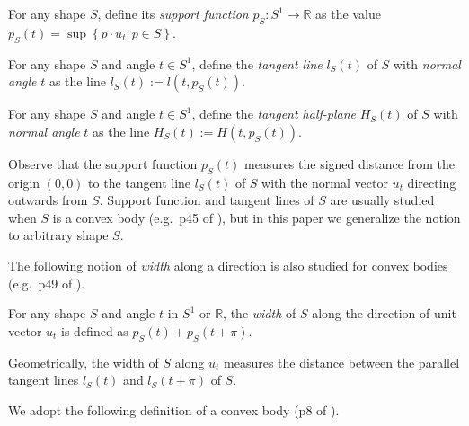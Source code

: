\begin{definition}

For any shape \(S\), define its \emph{support function} \(p_S : S^1 \to \mathbb{R}\) as the value \(p_S(t) = \sup \left\{ p \cdot u_t : p \in S \right\}\).

\label{def:support-function}
\end{definition}

\begin{definition}

For any shape \(S\) and angle \(t \in S^1\), define the \emph{tangent line} \(l_S(t)\) of \(S\) with \emph{normal angle} \(t\) as the line \(l_S(t) := l(t, p_S(t))\).

\label{def:tangent-line}
\end{definition}

\begin{definition}

For any shape \(S\) and angle \(t \in S^1\), define the \emph{tangent half-plane} \(H_S(t)\) of \(S\) with \emph{normal angle} \(t\) as the line \(H_S(t) := H(t, p_S(t))\).

\label{def:tangent-half-plane}
\end{definition}

Observe that the support function \(p_S(t)\) measures the signed distance from the origin \((0, 0)\) to the tangent line \(l_S(t)\) of \(S\) with the normal vector \(u_t\) directing outwards from \(S\). Support function and tangent lines of \(S\) are usually studied when \(S\) is a convex body (e.g.~p45 of \cite{schneider_2013}), but in this paper we generalize the notion to arbitrary shape \(S\).

The following notion of \emph{width} along a direction is also studied for convex bodies (e.g.~p49 of \cite{schneider_2013}).

\begin{definition}

For any shape \(S\) and angle \(t\) in \(S^1\) or \(\mathbb{R}\), the \emph{width} of \(S\) along the direction of unit vector \(u_t\) is defined as \(p_S(t) + p_S(t + \pi)\).

\label{def:width}
\end{definition}

Geometrically, the width of \(S\) along \(u_t\) measures the distance between the parallel tangent lines \(l_S(t)\) and \(l_S(t + \pi)\) of \(S\).

We adopt the following definition of a convex body (p8 of \cite{schneider_2013}).

